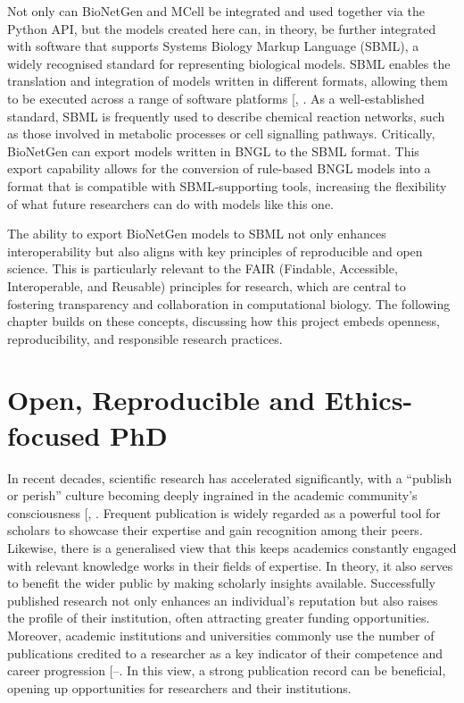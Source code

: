 \documentclass[
  11pt,
  letterpaper,
]{scrreprt}
\begin{document}
Not only can BioNetGen and MCell be integrated and used together via the
Python API, but the models created here can, in theory, be further
integrated with software that supports Systems Biology Markup Language
(SBML), a widely recognised standard for representing biological models.
SBML enables the translation and integration of models written in
different formats, allowing them to be executed across a range of
software platforms {[},
\citeproc{ref-keating2020SBML}{301}{]}. As a well-established standard,
SBML is frequently used to describe chemical reaction networks, such as
those involved in metabolic processes or cell signalling pathways.
Critically, BioNetGen can export models written in BNGL to the SBML
format. This export capability allows for the conversion of rule-based
BNGL models into a format that is compatible with SBML-supporting tools,
increasing the flexibility of what future researchers can do with models
like this one.

The ability to export BioNetGen models to SBML not only enhances
interoperability but also aligns with key principles of reproducible and
open science. This is particularly relevant to the FAIR (Findable,
Accessible, Interoperable, and Reusable) principles for research, which
are central to fostering transparency and collaboration in computational
biology. The following chapter builds on these concepts, discussing how
this project embeds openness, reproducibility, and responsible research
practices.


\chapter{Open, Reproducible and Ethics-focused
PhD}\label{sec-open-repro-chapter}

In recent decades, scientific research has accelerated significantly,
with a ``publish or perish'' culture becoming deeply ingrained in the
academic community's consciousness
{[},
\citeproc{ref-rawat2014Publish}{303}{]}. Frequent publication is widely
regarded as a powerful tool for scholars to showcase their expertise and
gain recognition among their peers. Likewise, there is a generalised
view that this keeps academics constantly engaged with relevant
knowledge works in their fields of expertise. In theory, it also serves
to benefit the wider public by making scholarly insights available.
Successfully published research not only enhances an individual's
reputation but also raises the profile of their institution, often
attracting greater funding opportunities. Moreover, academic
institutions and universities commonly use the number of publications
credited to a researcher as a key indicator of their competence and
career progression
{[}--\citeproc{ref-elbanna2023Publish}{306}{]}.
In this view, a strong publication record can be beneficial, opening up
opportunities for researchers and their institutions.
\end{document}
